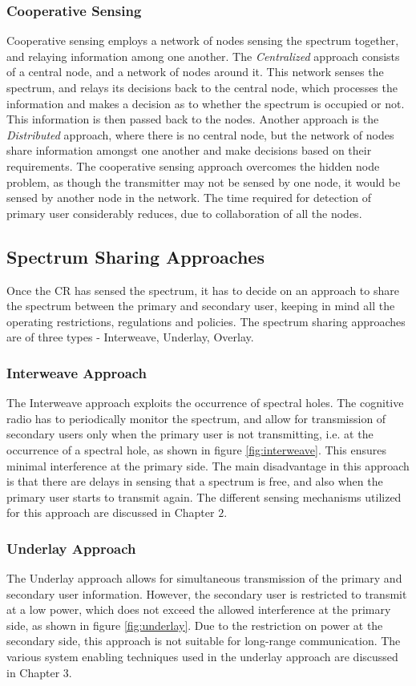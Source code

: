 \subsubsection{Cooperative Sensing}
Cooperative sensing employs a network of nodes sensing the spectrum together,
and relaying information among one another. The \textit{Centralized} approach
consists of a central node, and a network of nodes around it. This network
senses the spectrum, and relays its decisions back to the central node, which
processes the information and makes a decision as to whether the spectrum is
occupied or not. This information is then passed back to the nodes. Another
approach is the \textit{Distributed} approach, where there is no central node,
but the network of nodes share information amongst one another and make
decisions based on their requirements. The cooperative sensing approach
overcomes the hidden node problem, as though the transmitter may not be sensed
by one node, it would be sensed by another node in the network. The time
required for detection of primary user considerably reduces, due to
collaboration of all the nodes.

\subsection{Spectrum Sharing Approaches}
Once the CR has sensed the spectrum, it has to decide on an approach to share
the spectrum between the primary and secondary user, keeping in mind all the
operating restrictions, regulations and policies. The spectrum sharing
approaches are of three types - Interweave, Underlay, Overlay.

\subsubsection{Interweave Approach}
The Interweave approach exploits the occurrence of spectral holes. The cognitive
radio has to periodically monitor the spectrum, and allow for transmission of
secondary users only when the primary user is not transmitting, i.e. at the
occurrence of a spectral hole, as shown in figure \ref{fig:interweave}. This ensures minimal
interference at the primary side. The main disadvantage in this approach is that there are delays in sensing
that a spectrum is free, and also when the primary user starts to transmit
again. The different sensing mechanisms utilized for this approach are discussed
in Chapter $2$.

\subsubsection{Underlay Approach}
The Underlay approach allows for simultaneous transmission of the primary and
secondary user information. However, the secondary user is restricted to
transmit at a low power, which does not exceed the allowed interference at the
primary side, as shown in figure \ref{fig:underlay}. Due to the
restriction on power at the secondary side, this approach is not suitable for long-range communication. The various system
enabling techniques used in the underlay approach are discussed in Chapter $3$.

